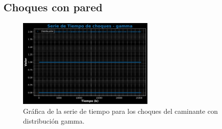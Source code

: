 \documentclass[11pt]{article} %
\begin{document}
	
	\subsection{Choques con pared}
	\begin{figure}[h]
		\centering
		\includegraphics[width=0.6\textwidth]{graf_choques_gamma.pdf}
		\caption{Gráfica de la serie de tiempo para los choques del caminante con distribución gamma.}
		\label{fig:chGammaGraf}
	\end{figure}
\end{document}
